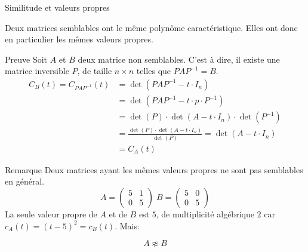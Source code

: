 \begin{parag}{Similitude et valeurs propres}
    \begin{theoreme}
        Deux matrices semblables ont le même polynôme caractéristique. Elles ont donc en particulier les mêmes valeurs propres.
    \end{theoreme}
    \begin{subparag}{Preuve}
        Soit $A$ et $B$ deux matrice non semblables. C'est à dire, il existe une matrice inversible $P$, de taille $n \times n$ telles que $PAP^{-1} = B$.\\
        \begin{align*}
            C_B(t) = C_{PAP^{-1}}(t) &= \det (PAP^{-1} - t\cdot I_n)\\
            &= \det (PAP^{-1} - t\cdot p\cdot P^{-1})\\
            &= \det(P) \cdot \det(A - t\cdot I_n) \cdot \det(P^{-1})\\
            &= \frac{\det(P) \cdot \det(A-t\cdot I_n)}{\det(P)} = \det(A - t\cdot I_n)\\
            &= C_A(t)
        \end{align*}
    \end{subparag}

    \begin{subparag}{Remarque}
        Deux matrices ayant les mêmes valeurs propres ne sont pas semblables en général.
        \[A = \begin{pmatrix}
            5 & 1 \\ 0 & 5
        \end{pmatrix} \; B = \begin{pmatrix}
            5 & 0 \\ 0 & 5
        \end{pmatrix}\]
        La seule valeur propre de $A$ et de $B$ est $5$, de multiplicité algébrique $2$ car $c_A(t) = (t-5)^2 = c_B(t)$. Mais:
        \begin{formule}
            \[ A \not\approx B\]
        \end{formule}
    \end{subparag}
\end{parag}




